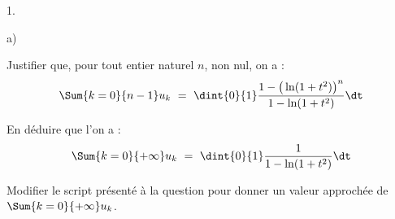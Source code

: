 \begin{noliste}{1.}
\begin{noliste}{a)}
    

  \item Justifier que, pour tout entier naturel $n$, non nul, on a :
    \[
    \Sum{k = 0}{n-1} u_k \ = \ \dint{0}{1} \dfrac{1 - \big( \ln(1 +
      t^2) \big)^n}{1 - \ln(1 + t^2)} \dt
    \]

    




  \item En déduire que l'on a : 
    \[
    \Sum{k = 0}{+\infty} u_k \ = \ \dint{0}{1} \dfrac{1}{1 - \ln(1 +
      t^2)} \dt
    \]

    

  \item Modifier le script présenté à la question  pour
    donner un valeur approchée de $\Sum{k = 0}{+\infty} u_k$.

    
  \end{noliste}  

\end{noliste}

